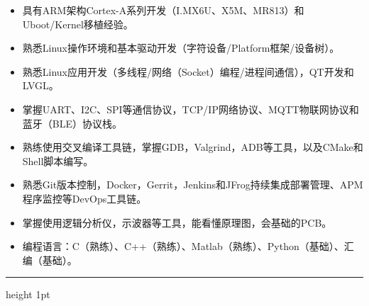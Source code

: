 \documentclass[11pt,a4paper]{article}
\begin{document}
	\begin{itemize}
		\item 具有ARM架构Cortex-A系列开发（I.MX6U、X5M、MR813）和Uboot/Kernel移植经验。
		\item 熟悉Linux操作环境和基本驱动开发（字符设备/Platform框架/设备树）。
		\item 熟悉Linux应用开发（多线程/网络（Socket）编程/进程间通信），QT开发和LVGL。
		\item 掌握UART、I2C、SPI等通信协议，TCP/IP网络协议、MQTT物联网协议和蓝牙（BLE）协议栈。
		\item 熟练使用交叉编译工具链，掌握GDB，Valgrind，ADB等工具，以及CMake和Shell脚本编写。
		\item 熟悉Git版本控制，Docker，Gerrit，Jenkins和JFrog持续集成部署管理、APM程序监控等DevOps工具链。
		\item 掌握使用逻辑分析仪，示波器等工具，能看懂原理图，会基础的PCB。
		\item 编程语言：C（熟练）、C++（熟练）、Matlab（熟练）、Python（基础）、汇编（基础）。
	\end{itemize}
	
	\vspace{1mm}
	\hrule height 1pt
	\vspace{1mm}
	
\end{document}
